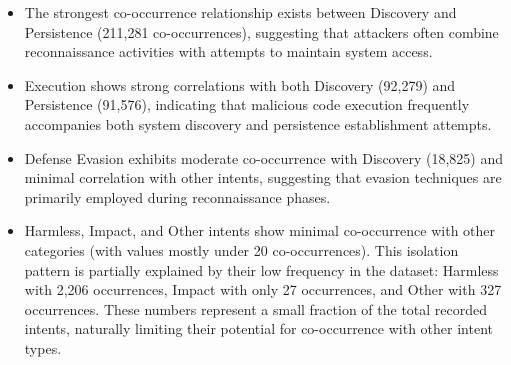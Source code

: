         \begin{itemize}
        
            \item The strongest co-occurrence relationship exists between Discovery and Persistence (211,281 co-occurrences), suggesting that attackers often combine reconnaissance activities with attempts to maintain system access.

            \vspace{0.2em}

            \item Execution shows strong correlations with both Discovery (92,279) and Persistence (91,576), indicating that malicious code execution frequently accompanies both system discovery and persistence establishment attempts.

            \vspace{0.2em}

            \item Defense Evasion exhibits moderate co-occurrence with Discovery (18,825) and minimal correlation with other intents, suggesting that evasion techniques are primarily employed during reconnaissance phases.

            \vspace{0.2em}

            \item Harmless, Impact, and Other intents show minimal co-occurrence with other categories (with values mostly under 20 co-occurrences). This isolation pattern is partially explained by their low frequency in the dataset: Harmless with 2,206 occurrences, Impact with only 27 occurrences, and Other with 327 occurrences. These numbers represent a small fraction of the total recorded intents, naturally limiting their potential for co-occurrence with other intent types.
            
        \end{itemize}
        
        \vspace{-0.2cm}
        
